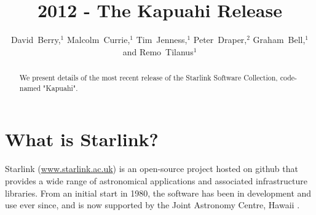 
\resetcounters




\title{ 2012 - The Kapuahi Release}

\author{David~Berry,$^1$ Malcolm~Currie,$^1$ Tim~Jenness,$^1$ Peter~Draper,$^2$ Graham~Bell,$^1$ and Remo~Tilanus$^1$
}


\begin{abstract}
We present details of the most recent release of the Starlink Software
Collection, code-named "Kapuahi".
\end{abstract}

\section{What is Starlink?}

Starlink (\url{www.starlink.ac.uk}) is an open-source project hosted on
github that provides a wide range of astronomical applications and
associated infrastructure libraries. From an initial start in 1980, the
software has been in development and use ever since, and is
now supported by the Joint Astronomy Centre, Hawaii
\citep{SSC_2009}.

